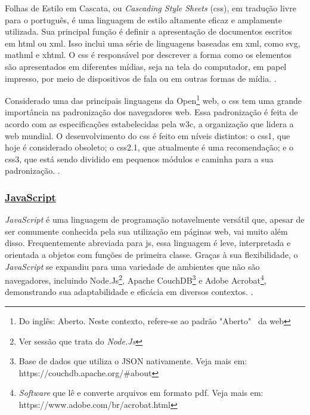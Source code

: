 Folhas de Estilo em Cascata, ou \textit{Cascading Style Sheets}
(\acrshort{css}),
em tradução livre
para o português, é uma linguagem de estilo altamente eficaz e amplamente utilizada. Sua
principal função é definir a apresentação de documentos escritos em
\acrshort{html}
ou
\acrshort{xml}.
Isso
inclui uma série de linguagens baseadas em
\acrshort{xml},
como
\acrshort{svg},
\acrshort{mathml}
e
\acrshort{xhtml}.
O
\acrshort{css}
é
responsável por descrever a forma como os elementos são apresentados em diferentes mídias,
seja na tela do computador, em papel impresso, por meio de dispositivos de fala ou em outras
formas de mídia.
\cite{mdn-css}.

Considerado uma das principais linguagens da
Open\footnote{Do inglês: Aberto. Neste contexto, refere-se ao padrão "Aberto"~ da
    \acrshort{web}
}
\acrshort{web},
o
\acrshort{css}
tem uma grande
importância na padronização dos navegadores
\acrshort{web}.
Essa padronização é feita de acordo com
as especificações estabelecidas pela
\acrshort{w3c},
a organização que lidera a
\acrshort{web}
mundial. O
desenvolvimento do
\acrshort{css}
é feito em níveis distintos: o
\acrshort{css}1,
que hoje é considerado
obsoleto; o
\acrshort{css}2.1,
que atualmente é uma recomendação; e o
\acrshort{css}3,
que está sendo dividido
em pequenos módulos e caminha para a sua padronização.
\cite{mdn-css}.

\subsubsection{\underline{JavaScript}}

\textit{JavaScript} é uma linguagem de programação notavelmente versátil que, apesar de ser
comumente conhecida pela sua utilização em páginas
\acrshort{web}, vai muito além disso.
Frequentemente abreviada para 
\acrshort{js}, essa linguagem é leve, interpretada e orientada a objetos
com funções de primeira classe. Graças à sua flexibilidade, o \textit{JavaScript} se expandiu para uma
variedade de ambientes que não são navegadores, incluindo
Node.Js\footnote{Ver sessão que trata do \textit{Node.Js}
},
Apache CouchDB\footnote{Base de dados que utiliza o JSON nativamente. Veja mais em:  \\ https://couchdb.apache.org/\#about
}
e
Adobe Acrobat\footnote{\textit{Software} que lê e converte arquivos em formato
    \acrshort{pdf}. Veja mais em:  \\ https://www.adobe.com/br/acrobat.html
},
demonstrando sua adaptabilidade e eficácia em diversos contextos.
\cite{mdn-js}.

